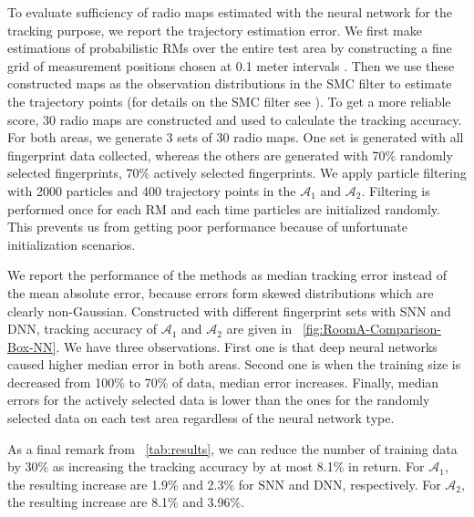 \documentclass{article}
\begin{document}
	
	To evaluate sufficiency of radio maps estimated with the neural network for the tracking purpose, we report the trajectory estimation error. We first make estimations of probabilistic RMs over the entire test area by constructing a fine grid of measurement positions chosen at 0.1 meter intervals \cite{Ser2017}. Then we use these constructed maps as the observation distributions in the SMC filter to estimate the trajectory points (for details on the SMC filter see \cite{Ser2017}). To get a more reliable score, 30 radio maps are constructed and used to calculate the tracking accuracy. For both areas, we generate 3 sets of 30 radio maps. One set is generated with all fingerprint data collected, whereas the others are generated with 70\% randomly selected fingerprints, 70\% actively selected fingerprints. We apply particle filtering with 2000 particles and 400 trajectory points in the $\mathcal{A}_1$ and $\mathcal{A}_2$. Filtering is performed once for each RM and each time particles are initialized randomly. This prevents us from getting poor performance because of unfortunate initialization scenarios.
	
	We report the performance of the methods as median tracking error instead of the mean absolute error, because errors form skewed distributions which are clearly non-Gaussian. Constructed with different fingerprint sets with SNN and DNN, tracking accuracy of $\mathcal{A}_1$ and $\mathcal{A}_2$ are given in \figurename~\ref{fig:RoomA-Comparison-Box-NN}. We have three observations. First one is that deep neural networks caused higher median error in both areas. Second one is when the training size is decreased from 100\% to 70\% of data, median error increases. Finally, median errors for the actively selected data is lower than the ones for the randomly selected data on each test area regardless of the neural network type. 
	
	As a final remark from \tablename~\ref{tab:results}, we can reduce the number of training data by 30\% as increasing the tracking accuracy by at most 8.1\% in return. For $\mathcal{A}_1$, the resulting increase are 1.9\% and 2.3\% for SNN and DNN, respectively. For $\mathcal{A}_2$, the resulting increase are 8.1\% and 3.96\%.
	
\end{document}
